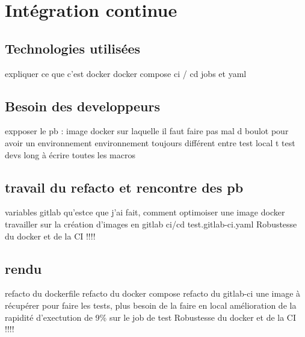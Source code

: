 \section{Intégration continue}
\subsection{Technologies utilisées}
expliquer ce que c'est
                    docker
                    docker compose
                    ci / cd
                    jobs et yaml

\subsection{Besoin des developpeurs}
expposer le pb : image docker sur laquelle il faut faire pas mal d boulot pour avoir un environnement
                    environnement toujours différent entre test local t test devs
                    long à écrire toutes les macros

\subsection{travail du refacto et rencontre des pb}
variables gitlab
qu'estce que j'ai fait, comment optimoiser une image docker
travailler sur la création d'images en gitlab ci/cd test.gitlab-ci.yaml
Robustesse du docker et de la CI !!!!

\subsection{rendu}
refacto du dockerfile
refacto du docker compose
refacto du gitlab-ci
    une image à récupérer pour faire les tests, plus besoin de la faire en local
    amélioration de la rapidité d'exectution de 9\% sur le job de test
    Robustesse du docker et de la CI !!!!
